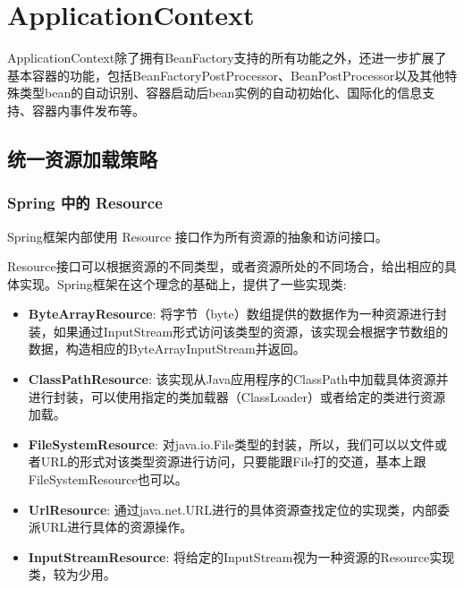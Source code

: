 \section{ApplicationContext}

ApplicationContext除了拥有BeanFactory支持的所有功能之外，还进一步扩展了基本容器的功能，包括BeanFactoryPostProcessor、BeanPostProcessor以及其他特殊类型bean的自动识别、容器启动后bean实例的自动初始化、国际化的信息支持、容器内事件发布等。

\subsection{统一资源加载策略}

\subsubsection{Spring 中的 Resource}

Spring框架内部使用 Resource 接口作为所有资源的抽象和访问接口。

Resource接口可以根据资源的不同类型，或者资源所处的不同场合，给出相应的具体实现。Spring框架在这个理念的基础上，提供了一些实现类:

\begin{itemize}
    \item \textbf{ByteArrayResource}: 将字节（byte）数组提供的数据作为一种资源进行封装，如果通过InputStream形式访问该类型的资源，该实现会根据字节数组的数据，构造相应的ByteArrayInputStream并返回。
    \item \textbf{ClassPathResource}: 该实现从Java应用程序的ClassPath中加载具体资源并进行封装，可以使用指定的类加载器（ClassLoader）或者给定的类进行资源加载。
    \item \textbf{FileSystemResource}: 对java.io.File类型的封装，所以，我们可以以文件或者URL的形式对该类型资源进行访问，只要能跟File打的交道，基本上跟FileSystemResource也可以。
    \item \textbf{UrlResource}: 通过java.net.URL进行的具体资源查找定位的实现类，内部委派URL进行具体的资源操作。
    \item \textbf{InputStreamResource}: 将给定的InputStream视为一种资源的Resource实现类，较为少用。
\end{itemize}

